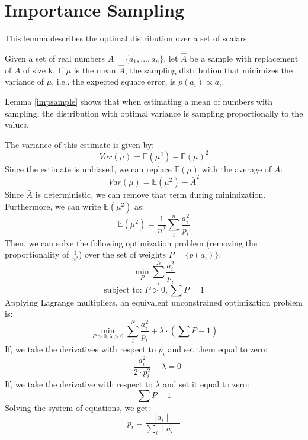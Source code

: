 \section{Importance Sampling}\label{impsample-deriv}
This lemma describes the optimal distribution over a set of scalars:
\begin{lemma}\label{impsample}
Given a set of real numbers $A = \{a_1,...,a_n\}$, let $\hat{A}$ be 
a sample with replacement of $A$ of size k.
If $\mu$ is the mean $\hat{A}$, the sampling distribution that minimizes
 the variance of $\mu$, i.e., the expected square error, is $p(a_i) \propto a_i$.
\end{lemma}
Lemma \ref{impsample} shows that when estimating a mean of numbers with sampling, the distribution with optimal variance is sampling proportionally to the values.

The variance of this estimate is given by:
\[
Var(\mu) = \mathbb{E}(\mu^2)-\mathbb{E}(\mu)^2
\] 
Since the estimate is unbiased, we can replace $\mathbb{E}(\mu)$ with the average of $A$:
\[
Var(\mu) = \mathbb{E}(\mu^2)-\bar{A}^2
\]
Since $\bar{A}$ is deterministic, we can remove that term during minimization.
Furthermore, we can write $\mathbb{E}(\mu^2)$ as:
\[
\mathbb{E}(\mu^2) = \frac{1}{n^2}\sum_i^n \frac{a_i^2}{p_i}
\]
Then, we can solve the following optimization problem (removing the proportionality of $\frac{1}{n^2}$) over the set of weights $P=\{p(a_i)\}$:
\[
\min_{P} \sum_i^N \frac{a_i^2}{p_i}
\]
\[
\text{subject to: } P > 0, \sum P = 1
\]
Applying Lagrange multipliers, an equivalent unconstrained optimization problem is:
\[
\min_{P > 0,\lambda > 0} \sum_i^N \frac{a_i^2}{p_i} + \lambda \cdot (\sum P - 1)
\]
If, we take the derivatives with respect to $p_i$ and set them equal to zero:
\[
-\frac{a_i^2}{2 \cdot p_i^2} + \lambda = 0
\]
If, we take the derivative with respect to $\lambda$ and set it equal to zero:
\[
\sum P - 1
\]
Solving the system of equations, we get:
\[
p_i = \frac{\mid a_i \mid }{\sum_i \mid a_i \mid}
\]

